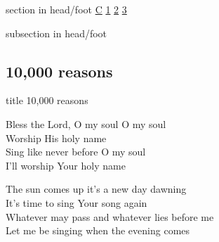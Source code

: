 \documentclass{beamer}
\begin{document}
{
{ 
 {
 \begin{beamercolorbox}[ht=4.5ex,dp=1.5ex,%
      leftskip=.3cm,rightskip=.3cm plus1fil]{section in head/foot}
 \fontsize{12}{25}\selectfont 
\hyperlink{10,000 reasons['Bless the Lord, O my soul']C}{C}
\hyperlink{10,000 reasons['Bless the Lord, O my soul']1}{1}
\hyperlink{10,000 reasons['Bless the Lord, O my soul']2}{2}
\hyperlink{10,000 reasons['Bless the Lord, O my soul']3}{3}
 
 \end{beamercolorbox}%
  \begin{beamercolorbox}[ht=2.5ex,dp=1.125ex,%
   leftskip=.3cm,rightskip=.3cm plus1fil]{subsection in head/foot}
   \insertauthor
 \end{beamercolorbox}%
 }
}
\subsection{ 10,000 reasons }

\hypertarget{10,000 reasons['Bless the Lord, O my soul']}{}
\begin{frame}{}
 \vfill
  \centering
  \begin{beamercolorbox}[sep=8pt,center,shadow=true,rounded=true]{title}
    10,000 reasons     
  \end{beamercolorbox}
  \vfill
\end{frame}

\hypertarget{10,000 reasons['Bless the Lord, O my soul']C}{}
\begin{frame}{}
\fontsize{ 15 }{ 19 }\selectfont

Bless the Lord, O my soul O my soul\\ 
Worship His holy name\\ 
Sing like never before O my soul\\ 
I'll worship Your holy name 

\end{frame}

\hypertarget{10,000 reasons['Bless the Lord, O my soul']1}{}
\begin{frame}{}
\fontsize{ 15 }{ 19 }\selectfont

The sun comes up it's a new day dawning\\ 
It's time to sing Your song again\\ 
Whatever may pass and whatever lies before me\\ 
Let me be singing when the evening comes 


\end{frame}}
\end{document}
